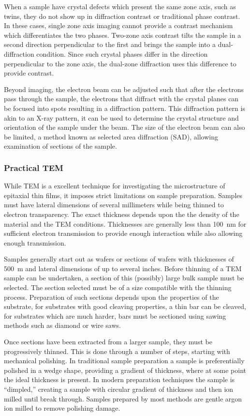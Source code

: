 When a sample have crystal defects which present the same zone axis, such as twins, they do not show up in diffraction contrast or traditional phase contrast.
In these cases, single zone axis imaging cannot provide a contrast mechanism which differentiates the two phases.
Two-zone axis contrast tilts the sample in a second direction perpendicular to the first and brings the sample into a dual-diffraction condition.
Since such crystal phases differ in the direction perpendicular to the zone axis, the dual-zone diffraction uses this difference to provide contrast.

Beyond imaging, the electron beam can be adjusted such that after the electrons pass through the sample, the electrons that diffract with the crystal planes can be focused into spots resulting in a diffraction pattern.
This diffraction pattern is akin to an X-ray pattern, it can be used to determine the crystal structure and orientation of the sample under the beam.
The size of the electron beam can also be limited, a method known as selected area diffraction (SAD), allowing examination of sections of the sample.
\subsubsection{Practical TEM} While TEM is a excellent technique for investigating the microstructure of epitaxial thin films, it imposes strict limitations on sample preparation.
Samples must have lateral dimensions of several millimeters while being thinned to electron transparency.
The exact thickness depends upon the the density of the material and the TEM conditions.
Thicknesses are generally less than 100~nm for sufficient electron transmission to provide enough interaction while also allowing enough transmission.

Samples generally start out as wafers or sections of wafers with thicknesses of 500~\micro{}m and lateral dimensions of up to several inches.
Before thinning of a TEM sample can be undertaken, a section of this (possibly) large bulk sample must be selected.
The section selected must be of a size compatible with the thinning process.
Preparation of such sections depends upon the properties of the substrate, for substrates with good cleaving properties, a thin bar can be cleaved, for substrates which are much harder, bars must be sectioned using sawing methods such as diamond or wire saws.

Once sections have been extracted from a larger sample, they must be progressively thinned.
This is done through a number of steps, starting with mechanical polishing.
In traditional sample preparation a sample is preferentially polished in a wedge shape, providing a gradient of thickness, where at some point the ideal thickness is present.
In modern preparation techniques the sample is ``dimpled,'' creating a sample with circular gradient of thickness and then ion milled until break through.
Samples prepared by most methods are gentle argon ion milled to remove polishing damage.

